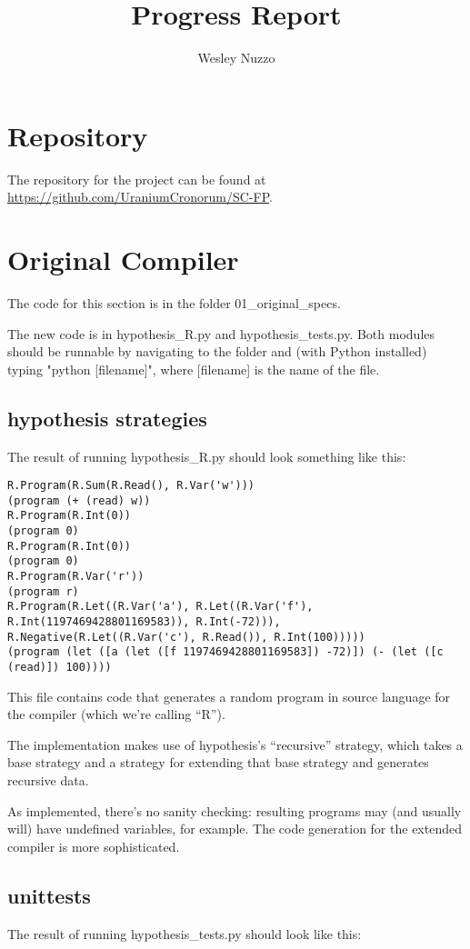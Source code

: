 \documentclass[11pt, oneside]{article}   	%
\title{Progress Report}
\author{Wesley Nuzzo}
\begin{document}
\maketitle

\section{Repository}
The repository for the project can be found at \url{https://github.com/UraniumCronorum/SC-FP}.

\section{Original Compiler}
The code for this section is in the folder {01\_original\_specs}. 

The new code is in hypothesis\_R.py and hypothesis\_tests.py. 
Both modules should be runnable by navigating to the folder and (with Python installed) typing "python  [filename]", where [filename] is the name of the file.

\subsection{hypothesis strategies}
The result of running hypothesis\_R.py should look something like this:

\begin{lstlisting}
R.Program(R.Sum(R.Read(), R.Var('w')))
(program (+ (read) w))
R.Program(R.Int(0))
(program 0)
R.Program(R.Int(0))
(program 0)
R.Program(R.Var('r'))
(program r)
R.Program(R.Let((R.Var('a'), R.Let((R.Var('f'), R.Int(1197469428801169583)), R.Int(-72))), R.Negative(R.Let((R.Var('c'), R.Read()), R.Int(100)))))
(program (let ([a (let ([f 1197469428801169583]) -72)]) (- (let ([c (read)]) 100))))
\end{lstlisting}

This file contains code that generates a random program in source language for the compiler (which we're calling ``R'').

The implementation makes use of hypothesis's ``recursive'' strategy, which takes a base strategy and a strategy for extending that base strategy and generates recursive data.

As implemented, there's no sanity checking: resulting programs may (and usually will) have undefined variables, for example. The code generation for the extended compiler is more sophisticated.

\subsection{unittests}
The result of running hypothesis\_tests.py should look like this:
\end{document}
